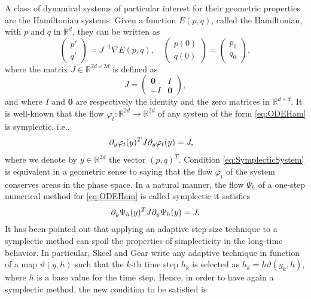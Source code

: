 \documentclass{siamart1116}
\numberwithin{theorem}{section}
\renewcommand{\phi}{\varphi}
\newcommand{\pdv}[2]{\ensuremath\partial_{#2}#1}
\newcommand{\R}{\mathbb{R}}
\begin{document}
{\color{shade}
A class of dynamical systems of particular interest for their geometric properties are the Hamiltonian systems. Given a function $E(p, q)$, called the Hamiltonian, with $p$ and $q$ in $\R^d$, they can be written as
\begin{equation}\label{eq:ODEHams}
\begin{pmatrix} p' \\ q' \end{pmatrix} = J^{-1}\nabla E(p, q), \quad \begin{pmatrix} p(0) \\ q(0) \end{pmatrix} = \begin{pmatrix} p_0 \\ q_0 \end{pmatrix},
\end{equation}
where the matrix $J\in\R^{2d \times 2d}$ is defined as
\begin{equation}
	J = \begin{pmatrix} \mathbf{0} & I \\ -I & \mathbf{0} \end{pmatrix},
\end{equation}
and where $I$ and $\mathbf{0}$ are respectively the identity and the zero matrices in $\R^{d\times d}$. It is well-known that the flow $\phi_t\colon\R^{2d}\to\R^{2d}$ of any system of the form \eqref{eq:ODEHam} is symplectic, i.e., 
\begin{equation}\label{eq:SymplecticSystems}
	\pdv{\phi_t(y)}{y}^T J \pdv{\phi_t(y)}{y} = J, \quad  
\end{equation}
where we denote by $y\in \R^{2d}$ the vector $(p, q)^T$. Condition \eqref{eq:SymplecticSystem} is equivalent in a geometric sense to saying that the flow $\phi_t$ of the system conserves areas in the phase space. In a natural manner, the flow $\Psi_h$ of a one-step numerical method for \eqref{eq:ODEHam} is called symplectic it satisfies
\begin{equation}\label{eq:SymplecticMethod}
	\pdv{\Psi_h(y)}{y}^T J \pdv{\Psi_h(y)}{y} = J.
\end{equation}
It has been pointed out \cite{SkG92, HLW06} that applying an adaptive step size technique to a symplectic method can spoil the properties of simplecticity in the long-time behavior. In particular, Skeel and Gear \cite{SkG92} write any adaptive technique in function of a map $\vartheta(y, h)$ such that the $k$-th time step $h_k$ is selected as $h_k = h\vartheta(y_k, h)$, where $h$ is a base value for the time step. Hence, in order to have again a symplectic method, the new condition to be satisfied is
}
\end{document}
